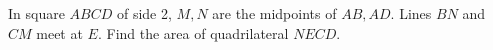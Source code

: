 In square $ABCD$ of side 2, $M,N$ are the midpoints of $AB,AD$. Lines $BN$ and $CM$ meet at $E$. Find the area of quadrilateral $NECD$.
